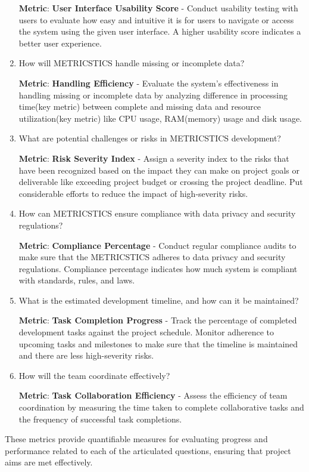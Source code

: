 \begin{enumerate}
    \textbf{Metric}: \textbf{User Interface Usability Score} \cite{user-usability} - Conduct usability testing with users to evaluate how easy and intuitive it is for users to navigate or access the system using the given user interface. A higher usability score indicates a better user experience.

    \item How will METRICSTICS handle missing or incomplete data?

    \textbf{Metric}: \textbf{Handling Efficiency} - Evaluate the system's effectiveness in handling missing or incomplete data by analyzing difference in processing time(key metric) between complete and missing data and resource utilization(key metric) like CPU usage, RAM(memory) usage and disk usage.

    \item What are potential challenges or risks in METRICSTICS development?

    \textbf{Metric}: \textbf{Risk Severity Index} \cite{risk-severity} - Assign a severity index to the risks that have been \mbox{recognized} based on the impact they can make on project goals or deliverable like exceeding project budget or crossing the project deadline. Put considerable efforts to reduce the impact of high-severity risks.

    \item How can METRICSTICS ensure compliance with data privacy and security regulations?

    \textbf{Metric}: \textbf{Compliance Percentage} \cite{compliance-audit} - Conduct regular compliance audits to make sure that the \mbox{METRICSTICS} adheres to data privacy and security regulations. Compliance percentage indicates how much system is compliant with standards, rules, and laws.

    \item What is the estimated development timeline, and how can it be maintained?

    \textbf{Metric}: \textbf{Task Completion Progress} \cite{task-completion}- Track the percentage of completed development tasks against the project schedule. Monitor adherence to upcoming tasks and milestones to make sure that the timeline is maintained and there are less high-severity risks.

    \item How will the team coordinate effectively?

    \textbf{Metric}: \textbf{Task Collaboration Efficiency} - Assess the efficiency of team coordination by \mbox{measuring} the time taken to complete collaborative tasks and the frequency of successful task \mbox{completions}.
\end{enumerate}

\noindent These metrics provide quantifiable measures for evaluating progress and performance related to each of the articulated questions, ensuring that project aims are met effectively.